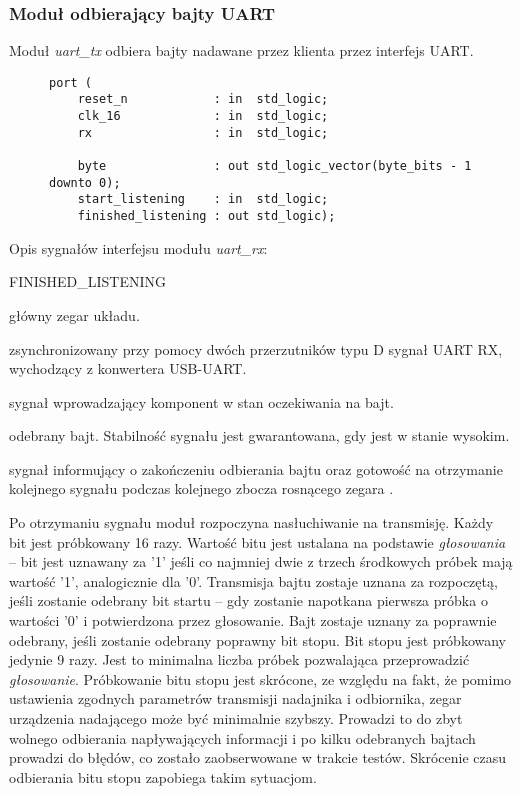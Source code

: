 \subsubsection{Moduł odbierający bajty UART}
Moduł \textit{uart\_tx} odbiera bajty nadawane przez klienta przez interfejs UART.

\begin{figure}[!h]
\begin{lstlisting}[style=vhdl, captionpos=b, caption={\textit{uart\_rx} -- interfejs modułu}]
port (
	reset_n            : in  std_logic;
	clk_16             : in  std_logic;
	rx                 : in  std_logic;
		
	byte               : out std_logic_vector(byte_bits - 1 downto 0);
	start_listening    : in  std_logic;
	finished_listening : out std_logic);
\end{lstlisting}
\end{figure}

Opis sygnałów interfejsu modułu \textit{uart\_rx}:
\begin{interface}{FINISHED\_LISTENING}
	\item[\insignal{CLK\_16}] główny zegar układu.
	\item[\insignal{RX}] zsynchronizowany przy pomocy dwóch przerzutników typu D sygnał UART RX, wychodzący z konwertera USB-UART.
	\item[\insignal{START\_LISTENING}] sygnał wprowadzający komponent w stan oczekiwania na bajt.
	\item[\outsignal{BYTE[7:0]}] odebrany bajt. Stabilność sygnału jest gwarantowana, gdy  jest w stanie wysokim.
	\item[\outsignal{FINISHED\_LISTENING}] sygnał informujący o zakończeniu odbierania bajtu oraz gotowość na otrzymanie kolejnego sygnału  podczas kolejnego zbocza rosnącego zegara .
\end{interface}

Po otrzymaniu sygnału  moduł rozpoczyna nasłuchiwanie na transmisję. Każdy bit jest próbkowany 16 razy. Wartość bitu jest ustalana na podstawie \textit{głosowania} -- bit jest uznawany za {'1'} jeśli co najmniej dwie z trzech środkowych próbek mają wartość {'1'}, analogicznie dla {'0'}. Transmisja bajtu zostaje uznana za rozpoczętą, jeśli zostanie odebrany bit startu -- gdy zostanie napotkana pierwsza próbka o wartości {'0'} i potwierdzona przez głosowanie. Bajt zostaje uznany za poprawnie odebrany, jeśli zostanie odebrany poprawny bit stopu. Bit stopu jest próbkowany jedynie 9 razy. Jest to minimalna liczba próbek pozwalająca przeprowadzić \textit{głosowanie}. Próbkowanie bitu stopu jest skrócone, ze względu na fakt, że pomimo ustawienia zgodnych parametrów transmisji nadajnika i odbiornika, zegar urządzenia nadającego może być minimalnie szybszy. Prowadzi to do zbyt wolnego odbierania napływających informacji i po kilku odebranych bajtach prowadzi do błędów, co zostało zaobserwowane w trakcie testów. Skrócenie czasu odbierania bitu stopu zapobiega takim sytuacjom.

